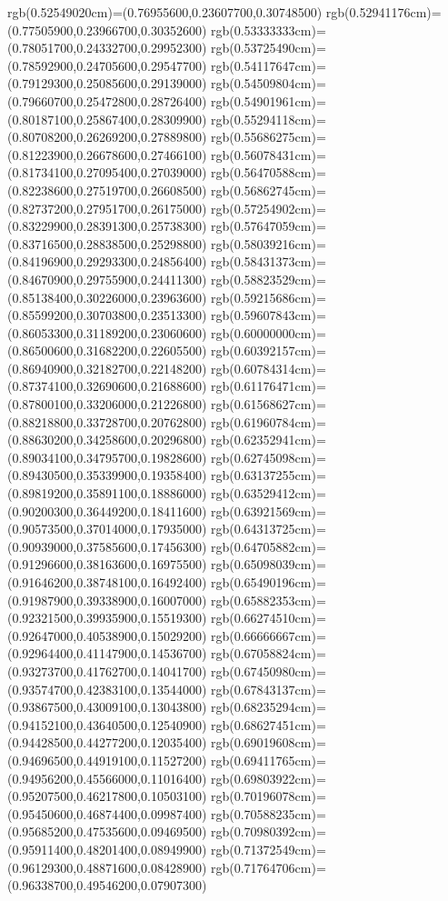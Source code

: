 {{rgb(0.52549020cm)=(0.76955600,0.23607700,0.30748500)
rgb(0.52941176cm)=(0.77505900,0.23966700,0.30352600)
rgb(0.53333333cm)=(0.78051700,0.24332700,0.29952300)
rgb(0.53725490cm)=(0.78592900,0.24705600,0.29547700)
rgb(0.54117647cm)=(0.79129300,0.25085600,0.29139000)
rgb(0.54509804cm)=(0.79660700,0.25472800,0.28726400)
rgb(0.54901961cm)=(0.80187100,0.25867400,0.28309900)
rgb(0.55294118cm)=(0.80708200,0.26269200,0.27889800)
rgb(0.55686275cm)=(0.81223900,0.26678600,0.27466100)
rgb(0.56078431cm)=(0.81734100,0.27095400,0.27039000)
rgb(0.56470588cm)=(0.82238600,0.27519700,0.26608500)
rgb(0.56862745cm)=(0.82737200,0.27951700,0.26175000)
rgb(0.57254902cm)=(0.83229900,0.28391300,0.25738300)
rgb(0.57647059cm)=(0.83716500,0.28838500,0.25298800)
rgb(0.58039216cm)=(0.84196900,0.29293300,0.24856400)
rgb(0.58431373cm)=(0.84670900,0.29755900,0.24411300)
rgb(0.58823529cm)=(0.85138400,0.30226000,0.23963600)
rgb(0.59215686cm)=(0.85599200,0.30703800,0.23513300)
rgb(0.59607843cm)=(0.86053300,0.31189200,0.23060600)
rgb(0.60000000cm)=(0.86500600,0.31682200,0.22605500)
rgb(0.60392157cm)=(0.86940900,0.32182700,0.22148200)
rgb(0.60784314cm)=(0.87374100,0.32690600,0.21688600)
rgb(0.61176471cm)=(0.87800100,0.33206000,0.21226800)
rgb(0.61568627cm)=(0.88218800,0.33728700,0.20762800)
rgb(0.61960784cm)=(0.88630200,0.34258600,0.20296800)
rgb(0.62352941cm)=(0.89034100,0.34795700,0.19828600)
rgb(0.62745098cm)=(0.89430500,0.35339900,0.19358400)
rgb(0.63137255cm)=(0.89819200,0.35891100,0.18886000)
rgb(0.63529412cm)=(0.90200300,0.36449200,0.18411600)
rgb(0.63921569cm)=(0.90573500,0.37014000,0.17935000)
rgb(0.64313725cm)=(0.90939000,0.37585600,0.17456300)
rgb(0.64705882cm)=(0.91296600,0.38163600,0.16975500)
rgb(0.65098039cm)=(0.91646200,0.38748100,0.16492400)
rgb(0.65490196cm)=(0.91987900,0.39338900,0.16007000)
rgb(0.65882353cm)=(0.92321500,0.39935900,0.15519300)
rgb(0.66274510cm)=(0.92647000,0.40538900,0.15029200)
rgb(0.66666667cm)=(0.92964400,0.41147900,0.14536700)
rgb(0.67058824cm)=(0.93273700,0.41762700,0.14041700)
rgb(0.67450980cm)=(0.93574700,0.42383100,0.13544000)
rgb(0.67843137cm)=(0.93867500,0.43009100,0.13043800)
rgb(0.68235294cm)=(0.94152100,0.43640500,0.12540900)
rgb(0.68627451cm)=(0.94428500,0.44277200,0.12035400)
rgb(0.69019608cm)=(0.94696500,0.44919100,0.11527200)
rgb(0.69411765cm)=(0.94956200,0.45566000,0.11016400)
rgb(0.69803922cm)=(0.95207500,0.46217800,0.10503100)
rgb(0.70196078cm)=(0.95450600,0.46874400,0.09987400)
rgb(0.70588235cm)=(0.95685200,0.47535600,0.09469500)
rgb(0.70980392cm)=(0.95911400,0.48201400,0.08949900)
rgb(0.71372549cm)=(0.96129300,0.48871600,0.08428900)
rgb(0.71764706cm)=(0.96338700,0.49546200,0.07907300)
}}
